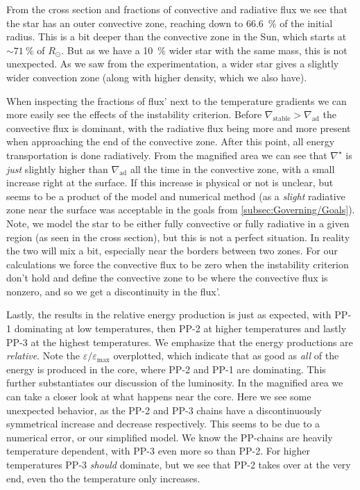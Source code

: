 \documentclass[11pt,a4paper,twocolumn,titlepage]{article}
\newcommand{\nablastb}
{
\nabla_{\text{stable}}
}
\newcommand{\nablaad}
{
\nabla_{\text{ad}}
}
\newcommand{\nablastar}
{
\nabla^\star
}
\begin{document}
From the cross section and fractions of convective and radiative flux we see that the star has an outer convective zone, reaching down to \SI{66.6}{\percent} of the initial radius. This is a bit deeper than the convective zone in the Sun, which starts at $\sim \SI{71}{\percent}$ of $R_\odot$. But as we have a \SI{10}{\percent} wider star with the same mass, this is not unexpected. As we saw from the experimentation, a wider star gives a slightly wider convection zone (along with higher density, which we also have). 

When inspecting the fractions of flux' next to the temperature gradients we can more easily see the effects of the instability criterion. Before $\nablastb>\nablaad$ the convective flux is dominant, with the radiative flux being more and more present when approaching the end of the convective zone. After this point, all energy transportation is done radiatively. From the magnified area we can see that $\nablastar$ is \textit{just} slightly higher than $\nablaad$ all the time in the convective zone, with a small increase right at the surface. If this increase is physical or not is unclear, but seems to be a product of the model and numerical method (as a \textit{slight} radiative zone near the surface was acceptable in the goals from \cref{subsec:Governing/Goals}). Note, we model the star to be either fully convective or fully radiative in a given region (as seen in the cross section), but this is not a perfect situation. In reality the two will mix a bit, especially near the borders between two zones. For our calculations we force the convective flux to be zero when the instability criterion don't hold and define the convective zone to be where the convective flux is nonzero, and so we get a discontinuity in the flux'.

Lastly, the results in the relative energy production is just as expected, with PP-1 dominating at low temperatures, then PP-2 at higher temperatures and lastly PP-3 at the highest temperatures. We emphasize that the energy productions are \textit{relative}. Note the $\varepsilon/\varepsilon_\text{max}$ overplotted, which indicate that as good as \textit{all} of the energy is produced in the core, where PP-2 and PP-1 are dominating. This further substantiates our discussion of the luminosity. In the magnified area we can take a closer look at what happens near the core. Here we see some unexpected behavior, as the PP-2 and PP-3 chains have a discontinuously symmetrical increase and decrease respectively. This seems to be due to a numerical error, or our simplified model. We know the PP-chains are heavily temperature dependent, with PP-3 even more so than PP-2. For higher temperatures PP-3 \textit{should} dominate, but we see that PP-2 takes over at the very end, even tho the temperature only increases.
\end{document}
